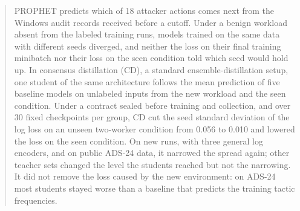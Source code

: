 \begin{abstract}
PROPHET predicts which of 18 attacker actions comes next from the
Windows audit records received before a cutoff. Under a benign workload
absent from the labeled training runs, models trained on the same data
with different seeds diverged, and neither the loss on their final
training minibatch nor their loss on the seen condition told which seed
would hold up. In
consensus distillation (CD), a standard ensemble-distillation setup, one
student of the same architecture follows the mean prediction of five
baseline models on unlabeled inputs from the new workload and the seen
condition. Under a contract sealed before training and collection, and
over 30 fixed checkpoints per group, CD cut the seed standard deviation
of the log loss on an unseen
two-worker condition from 0.056 to 0.010 and lowered the loss on the
seen condition. On new runs, with three general log encoders, and on
public ADS-24 data, it narrowed the spread again; other teacher sets changed
the level the students reached but not the narrowing. It did not remove the
loss caused by the new environment: on ADS-24 most students stayed
worse than a baseline that predicts the training tactic frequencies.
\end{abstract}

